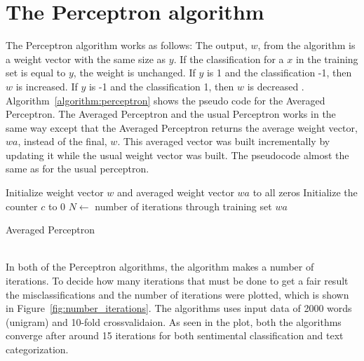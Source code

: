 \section{The Perceptron algorithm}
The Perceptron algorithm works as follows:
The output, $w$, from the algorithm is a weight vector with the same size as $y$. If the classification for a $x$ in the training set is equal to $y$, the weight is unchanged.
If $y$ is 1 and the classification -1, then $w$ is increased. If $y$ is -1 and the classification 1, then $w$ is decreased \citep{perceptron_ai}. Algorithm~\ref{algorithm:perceptron} shows the pseudo code for the Averaged Perceptron. The Averaged Perceptron and the usual Perceptron works in the same way except that the Averaged Perceptron returns the average weight vector, $wa$, instead of the final, $w$.
This averaged vector was built incrementally by updating it while the usual weight vector was built. The pseudocode almost the same as for the usual perceptron.
\begin{algorithm}[h!]
 \SetAlgoLined
 Initialize weight vector $w$ and averaged weight vector $wa$ to all zeros\;
 Initialize the counter $c$ to 0\;
 $N \leftarrow$ number of iterations through training set\;
 \Return $wa$
 \caption{Averaged Perceptron}
 \label{algorithm:perceptron}
\end{algorithm} \\
In both of the Perceptron algorithms, the algorithm makes a number of iterations. To decide how many iterations that must be done to get a fair result the misclassifications and the number of iterations were plotted, which is shown in Figure~\ref{fig:number_iterations}. The algorithms uses input data of 2000 words (unigram) and 10-fold crossvalidaion. As seen in the plot, both the algorithms converge after around 15 iterations for both sentimental classification and text categorization. 
